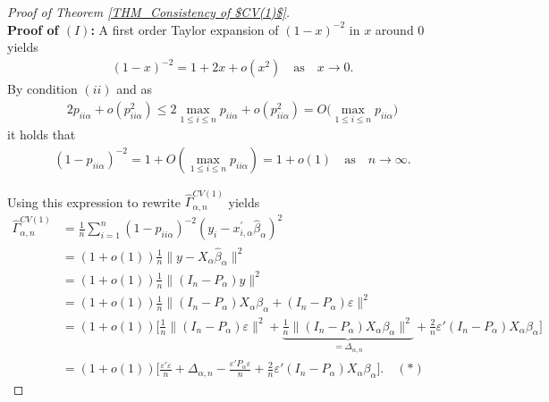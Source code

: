 \documentclass[Research_Module_ES.tex]{subfiles}
\begin{document}
\begin{proof}[Proof of Theorem \ref{THM_Consistency of $CV(1)$}]~\\
	\textbf{Proof of $(I)$:} A first order Taylor expansion of $(1-x)^{-2}$ in $x$ around $0$ yields 
	\begin{align*}
	(1- x)^{-2} = 1+ 2 x + o(x^2) \quad \textrm{as} \quad x\to 0 .
	\end{align*}
	By condition $(ii)$ and as
	\begin{align*}
	2p_{ii\alpha} + o(p_{ii\alpha}^2) 
	\le 2 \max_{1\le i \le n} p_{ii\alpha} +  o(p_{ii\alpha}^2) 
	= O\bigl(\max _{1\le i \le n} p_{ii\alpha}\bigr)
	\end{align*}
	it holds that 
	\begin{align*}
	(1- p_{ii\alpha})^{-2} = 1+ O(\max _{1\le i \le n} p_{ii\alpha}) 
	= 1 +o(1) \quad \textrm{as} \quad n \to \infty. 
	\end{align*}
	
	Using this expression to rewrite $\hat{\Gamma}_{\alpha,n}^{CV(1)}$ yields
	\begin{align*}
	\hat{\Gamma}_{\alpha,n}^{CV(1)} &= \frac{1}{n}\sum_{i=1}^n (1- p_{ii\alpha})^{-2}(y_i-x_{i,\alpha}^\prime\hat{\beta}_\alpha)^2\\
	&= (1+o(1))\frac{1}{n}\lVert y-X_{\alpha}\hat{\beta}_\alpha\rVert^2\\
	&= (1+o(1))\frac{1}{n}\lVert (I_n-P_\alpha) y\rVert^2\\
	&= (1+o(1))\frac{1}{n}\lVert (I_n-P_\alpha) X_\alpha\beta_\alpha +(I_n-P_\alpha)\varepsilon \rVert^2\\
	&= (1+o(1))\biggl[\frac{1}{n}\lVert(I_n-P_\alpha)\varepsilon \rVert^2+ \underbrace{\frac{1}{n}\lVert (I_n-P_\alpha) X_\alpha\beta_\alpha\rVert^2}_{=\Delta_{\alpha,n}} +\frac{2}{n}\varepsilon'(I_n-P_\alpha) X_\alpha\beta_\alpha\biggr]\\
	&= (1+o(1)) \biggl[\frac{\varepsilon'\varepsilon}{n} + \Delta_{\alpha,n} - \frac{\varepsilon'P_\alpha\varepsilon}{n} +\frac{2}{n}\varepsilon'(I_n-P_\alpha) X_\alpha\beta_\alpha\biggr]. \quad (\ast)
	\end{align*}
	

\end{proof}
\end{document}
